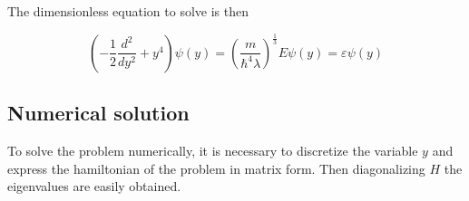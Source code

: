 \documentclass{article}
\begin{document}
The dimensionless equation to solve is then

\begin{equation}
\left( -\frac{1}{2}\frac{d^2}{dy^2} + y^4 \right) \psi(y) = \left(\frac{m}{\hbar^4 \lambda} \right)^{\frac{1}{3}} E \psi(y) = \varepsilon \psi(y)
\end{equation}

\subsection{Numerical solution}

To solve the problem numerically, it is necessary to discretize the variable \( y \) and express the hamiltonian of the problem in matrix form. Then diagonalizing \( H \) the eigenvalues are easily obtained.
\end{document}
